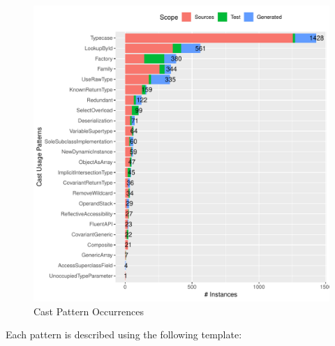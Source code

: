 





\begin{figure}[ht!]
\centering
\includegraphics[width=\textwidth]{analysis/table-patterns.pdf}
\caption{Cast Pattern Occurrences} \label{fig:patterns}
\end{figure}

Each pattern is described using the following template:

